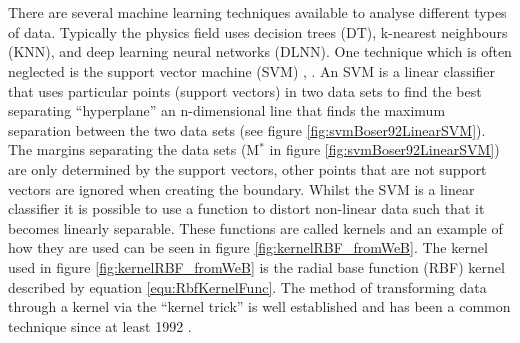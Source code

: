 \\\\There are several machine learning techniques available to analyse different types of data. Typically the physics field uses decision trees (DT), k-nearest neighbours (KNN), and deep learning neural networks (DLNN). One technique which is often neglected is the support vector machine (SVM) \cite{Boser92atraining}, \cite{cortes1995support}. An SVM is a linear classifier that uses particular points (support vectors) in two data sets to find the best separating ``hyperplane'' an n-dimensional line that finds the maximum separation between the two data sets (see figure \ref{fig:svmBoser92LinearSVM}). The margins separating the data sets (M$^*$ in figure \ref{fig:svmBoser92LinearSVM}) are only determined by the support vectors, other points that are not support vectors are ignored when creating the boundary. Whilst the SVM is a linear classifier it is possible to use a function to distort non-linear data such that it becomes linearly separable. These functions are called kernels and an example of how they are used can be seen in figure \ref{fig:kernelRBF_fromWeB}. The kernel used in figure \ref{fig:kernelRBF_fromWeB} is the radial base function (RBF) kernel described by equation \ref{equ:RbfKernelFunc}. The method of transforming data through a kernel via the ``kernel trick'' is well established and has been a common technique since at least 1992 \cite{Boser92atraining}.
